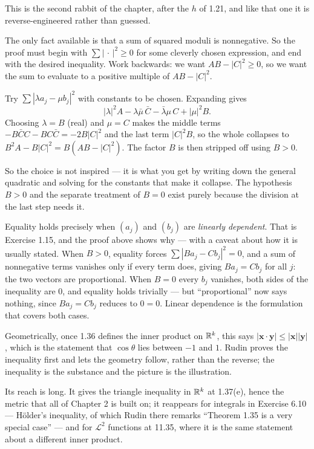 \begin{unpack}
This is the second rabbit of the chapter, after the $h$ of 1.21, and like that
one it is reverse-engineered rather than guessed.

The only fact available is that a sum of squared moduli is nonnegative. So the
proof must begin with $\sum|\,\cdot\,|^2 \ge 0$ for some cleverly chosen
expression, and end with the desired inequality. Work backwards: we want
$AB - |C|^2 \ge 0$, so we want the sum to evaluate to a positive multiple of
$AB - |C|^2$.

Try $\sum|\lambda a_j - \mu b_j|^2$ with constants to be chosen. Expanding gives
\[ |\lambda|^2 A - \lambda\bar\mu\, \bar C - \bar\lambda\mu\, C + |\mu|^2 B . \]
Choosing $\lambda = B$ (real) and $\mu = C$ makes the middle terms
$-B\bar C C - BC\bar C = -2B|C|^2$ and the last term $|C|^2B$, so the whole
collapses to $B^2A - B|C|^2 = B(AB - |C|^2)$. The factor $B$ is then stripped
off using $B>0$.

\smallskip
So the choice is not inspired --- it is what you get by writing down the general
quadratic and solving for the constants that make it collapse. The hypothesis
$B > 0$ and the separate treatment of $B = 0$ exist purely because the division
at the last step needs it.
\end{unpack}

\begin{deeper}
Equality holds precisely when $(a_j)$ and $(b_j)$ are \emph{linearly dependent}.
That is Exercise 1.15, and the proof above shows why --- with a caveat about how
it is usually stated. When $B>0$, equality forces $\sum|Ba_j-Cb_j|^2 = 0$, and a
sum of nonnegative terms vanishes only if every term does, giving
$Ba_j = Cb_j$ for all $j$: the two vectors are proportional. When $B = 0$ every
$b_j$ vanishes, both sides of the inequality are $0$, and equality holds
trivially --- but ``proportional'' now says nothing, since $Ba_j = Cb_j$ reduces
to $0=0$. Linear dependence is the formulation that covers both cases.

Geometrically, once 1.36 defines the inner product on $\mathbb{R}^k$, this says
$|\mathbf{x}\cdot\mathbf{y}| \le |\mathbf{x}||\mathbf{y}|$, which is the
statement that $\cos\theta$ lies between $-1$ and $1$. Rudin proves the
inequality first and lets the geometry follow, rather than the reverse; the
inequality is the substance and the picture is the illustration.

Its reach is long. It gives the triangle inequality in $\mathbb{R}^k$ at 1.37(e), hence
the metric that all of Chapter 2 is built on; it reappears for integrals in
Exercise 6.10 --- H\"older's inequality, of which Rudin there remarks
``Theorem 1.35 is a very special case'' --- and for $\mathscr{L}^2$ functions
at 11.35, where it is the same statement about a different inner product.
\end{deeper}
